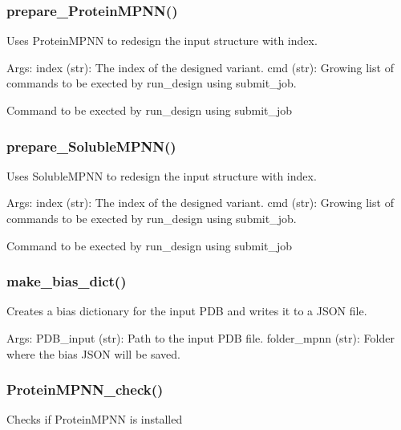 \documentclass[10pt]{extarticle}
\begin{document}
\subsubsection{prepare\_ProteinMPNN()}
Uses ProteinMPNN to redesign the input structure with index.

Args:
index (str): The index of the designed variant.
cmd (str): Growing list of commands to be exected by run\_design using submit\_job.

\par\vspace*{0.5\baselineskip}
{
\begin{description}[noitemsep,topsep=0pt,parsep=0pt,labelwidth=5cm,leftmargin=!,labelindent=0pt,labelsep=0.2cm,itemsep=0pt]
\item[\textcolor{mpgAccentBlue!75!white}{cmd (str)\dotfill}] Command to be exected by run\_design using submit\_job
\end{description}
}
\subsubsection{prepare\_SolubleMPNN()}
Uses SolubleMPNN to redesign the input structure with index.

Args:
index (str): The index of the designed variant.
cmd (str): Growing list of commands to be exected by run\_design using submit\_job.

\par\vspace*{0.5\baselineskip}
{
\begin{description}[noitemsep,topsep=0pt,parsep=0pt,labelwidth=5cm,leftmargin=!,labelindent=0pt,labelsep=0.2cm,itemsep=0pt]
\item[\textcolor{mpgAccentBlue!75!white}{cmd (str)\dotfill}] Command to be exected by run\_design using submit\_job
\end{description}
}
\subsubsection{make\_bias\_dict()}
Creates a bias dictionary for the input PDB and writes it to a JSON file.

Args:
PDB\_input (str): Path to the input PDB file.
folder\_mpnn (str): Folder where the bias JSON will be saved.
\subsubsection{ProteinMPNN\_check()}
Checks if ProteinMPNN is installed
\end{document}
